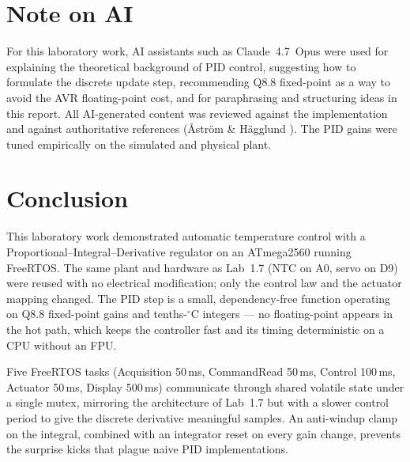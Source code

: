\documentclass[12pt]{article}
\begin{document}
\section{Note on AI}

\hspace{0.8cm}
For this laboratory work, AI assistants such as Claude~4.7~Opus were used for explaining the theoretical background of PID control, suggesting how to formulate the discrete update step, recommending Q8.8 fixed-point as a way to avoid the AVR floating-point cost, and for paraphrasing and structuring ideas in this report. All AI-generated content was reviewed against the implementation and against authoritative references (Åström \& Hägglund \cite{astrom}). The PID gains were tuned empirically on the simulated and physical plant.

\section{Conclusion}

\hspace{0.8cm}
This laboratory work demonstrated automatic temperature control with a Proportional--Integral--Derivative regulator on an ATmega2560 running FreeRTOS. The same plant and hardware as Lab~1.7 (NTC on A0, servo on D9) were reused with no electrical modification; only the control law and the actuator mapping changed. The PID step is a small, dependency-free function operating on Q8.8 fixed-point gains and tenths-$^{\circ}$C integers --- no floating-point appears in the hot path, which keeps the controller fast and its timing deterministic on a CPU without an FPU.

\hspace{0.8cm}
Five FreeRTOS tasks (Acquisition 50\,ms, CommandRead 50\,ms, Control 100\,ms, Actuator 50\,ms, Display 500\,ms) communicate through shared volatile state under a single mutex, mirroring the architecture of Lab~1.7 but with a slower control period to give the discrete derivative meaningful samples. An anti-windup clamp on the integral, combined with an integrator reset on every gain change, prevents the surprise kicks that plague naive PID implementations.
\end{document}
